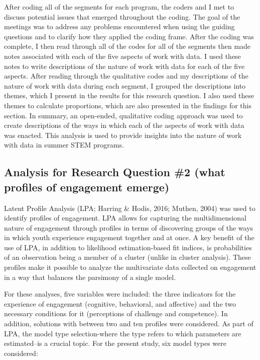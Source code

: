 \documentclass[]{msu-thesis}
\theoremstyle{definition}
\theoremstyle{definition}
\theoremstyle{definition}
\theoremstyle{remark}
\begin{document}
After coding all of the segments for each program, the coders and I met
to discuss potential issues that emerged throughout the coding. The goal
of the meetings was to address any problems encountered when using the
guiding questions and to clarify how they applied the coding frame.
After the coding was complete, I then read through all of the codes for
all of the segments then made notes associated with each of the five
aspects of work with data. I used these notes to write descriptions of
the nature of work with data for each of the five aspects. After reading
through the qualitative codes and my descriptions of the nature of work
with data during each segment, I grouped the descriptions into themes,
which I present in the results for this research question. I also used
these themes to calculate proportions, which are also presented in the
findings for this section. In summary, an open-ended, qualitative coding
approach was used to create descriptions of the ways in which each of
the aspects of work with data was enacted. This analysis is used to
provide insights into the nature of work with data in summer STEM
programs.

\subsection{Analysis for Research Question \#2 (what profiles of
engagement
emerge)}\label{analysis-for-research-question-2-what-profiles-of-engagement-emerge}

Latent Profile Analysis (LPA; Harring \& Hodis, 2016; Muthen, 2004) was
used to identify profiles of engagement. LPA allows for capturing the
multidimensional nature of engagement through profiles in terms of
discovering groups of the ways in which youth experience engagement
together and at once. A key benefit of the use of LPA, in addition to
likelihood estimation-based fit indices, is probabilities of an
observation being a member of a cluster (unlike in cluster analysis).
These profiles make it possible to analyze the multivariate data
collected on engagement in a way that balances the parsimony of a single
model.

For these analyses, five variables were included: the three indicators
for the experience of engagement (cognitive, behavioral, and affective)
and the two necessary conditions for it (perceptions of challenge and
competence). In addition, solutions with between two and ten profiles
were considered. As part of LPA, the model type selection-where the type
refers to which parameters are estimated--is a crucial topic. For the
present study, six model types were considered:
\end{document}
